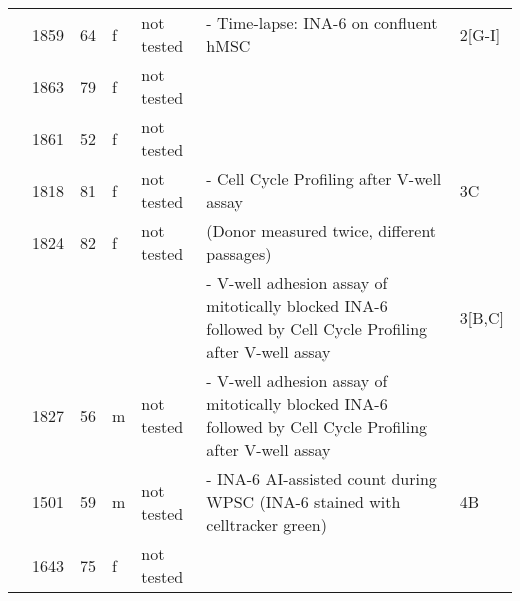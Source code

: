 {\begin{longtable}{|p{1.5cm}|p{1cm}|p{1cm}|p{1cm}|p{2cm}|p{6cm}|p{1.7cm}|}
                           & 1859                  & 64                  & f                  & not tested                                & - Time-lapse: INA-6 on confluent hMSC                                                                    & 2[G-I]             \\
                           & 1863                  & 79                  & f                  & not tested                                &                                                                                                          &                    \\
                           & 1861                  & 52                  & f                  & not tested                                &                                                                                                          &                    \\
                           & 1818                  & 81                  & f                  & not tested                                & - Cell Cycle Profiling after V-well assay                                                                & 3C                 \\
                           & 1824                  & 82                  & f                  & not tested                                & (Donor measured twice, different passages)                                                               &                    \\
                           &                       &                     &                    &                                           & - V-well adhesion assay of mitotically blocked INA-6 followed by Cell Cycle Profiling after V-well assay & 3[B,C]             \\
                           & 1827                  & 56                  & m                  & not tested                                & - V-well adhesion assay of mitotically blocked INA-6 followed by Cell Cycle Profiling after V-well assay &                    \\
                           & 1501                  & 59                  & m                  & not tested                                & - INA-6 AI-assisted count during WPSC (INA-6 stained with celltracker green)                             & 4B                 \\
                           & 1643                  & 75                  & f                  & not tested                                &                                                                                                          &                    \\

\end{longtable}}
